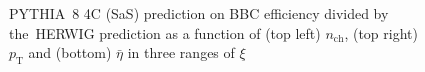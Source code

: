 \begin{figure}[t!]
\begin{subfigure}{.45\textwidth}
	\end{subfigure}
	\begin{minipage}{.45\textwidth}
		\caption{PYTHIA~8 4C (SaS) prediction on BBC efficiency  divided by the~HERWIG prediction as a function of (top left) $n_\textrm{ch}$, (top right) $p_\textrm{T}$ and (bottom)  $\bar{\eta}$ in three ranges of $\xi$}
		\label{fig:bbcCorection_syst}
	\end{minipage}
	
\end{figure}

\FloatBarrier